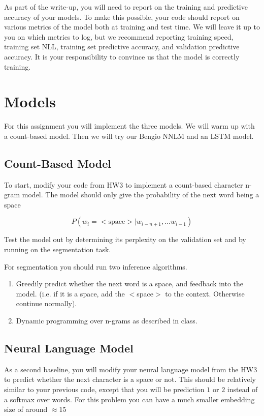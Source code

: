\documentclass[11pt]{article}
\begin{document}
As part of the write-up, you will need to report on the training and
predictive accuracy of your models. To make this possible, your code
should report on various metrics of the model both at training and
test time. We will leave it up to you on which metrics to log, but we
recommend reporting training speed, training set NLL, training set
predictive accuracy, and validation predictive accuracy. It is your
responsibility to convince us that the model is correctly training.

\section{Models}

For this assignment you will implement the three models. We will warm
up with a count-based model. Then we will
try our Bengio NNLM and an LSTM model. 


\subsection{Count-Based Model}

To start, modify your code from HW3
to implement a count-based character n-gram model. 
The model should only give the probability of the next 
word being a space  

\[ P(w_i =<\mathrm{space}> | w_{i-n+1}, \ldots w_{i-1}) \]

Test the model out by determining its perplexity on 
the validation set and by running on the segmentation task. 

For segmentation you should run two inference algorithms. 

\begin{enumerate}
\item Greedily predict whether the next word is a space, and feedback 
  into the model. (i.e. if it is a space, add the $<$space$>$ to the context. Otherwise continue normally).

\item Dynamic programming over n-grams as described in class. 
\end{enumerate}

\subsection{Neural Language Model}

As a second baseline, you will modify your neural language 
model from the HW3 to predict whether the next character is a 
space or not. This should be relatively similar to your previous 
code, except that you will be prediction $1$ or $2$ instead 
of a softmax over words. For this problem you can have a much smaller embedding 
size of around $\approx 15$ 
\end{document}

